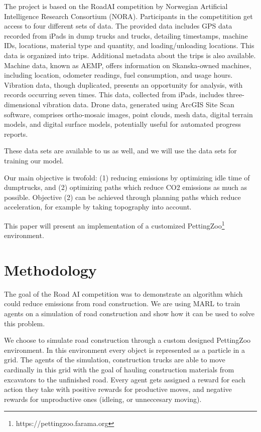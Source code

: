 \documentclass[conference]{IEEEtran}
\begin{document}
The project is based on the RoadAI competition by Norwegian Artificial Intelligence Research
Consortium (NORA)\cite{noraRoadAIReducing}. Participants in the competitition get access to four
different sets of data. The provided data includes GPS data recorded from iPads in dump trucks and
trucks, detailing timestamps, machine IDs, locations, material type and quantity, and loading/unloading
locations. This data is organized into trips. Additional metadata about the trips is also available.
Machine data, known as AEMP, offers information on Skanska-owned machines, including location,
odometer readings, fuel consumption, and usage hours. Vibration data, though duplicated,
presents an opportunity for analysis, with records occurring seven times. This data, collected from
iPads, includes three-dimensional vibration data. Drone data, generated using ArcGIS Site Scan software,
comprises ortho-mosaic images, point clouds, mesh data, digital terrain models, and digital surface models,
potentially useful for automated progress reports.

These data sets are available to us as well, and we will use the data sets for training our model.

Our main objective is twofold: (1) reducing emissions by optimizing idle time of dumptrucks, and (2)
optimizing paths which reduce CO2 emissions as much as possible. Objective (2) can be achieved through
planning paths which reduce acceleration, for example by taking topography into account.

This paper will present an implementation of a customized PettingZoo\footnote{https://pettingzoo.farama.org}
environment.


\section{Methodology}

The goal of the Road AI competition was to demonstrate an algorithm which could reduce emissions from road construction.
We are using MARL to train agents on a simulation of road construction and show how it can be used to solve this problem.

We choose to simulate road construction through a custom designed PettingZoo environment.
In this environment every object is represented as a particle in a grid. 
The agents of the simulation, construction trucks are able to move cardinally in this grid with the goal of hauling construction materials from excavators to the unfinished road. 
Every agent gets assigned a reward for each action they take with positive rewards for productive moves, and negative rewards for unproductive ones (idleing, or unneccesary moving). 
\end{document}
